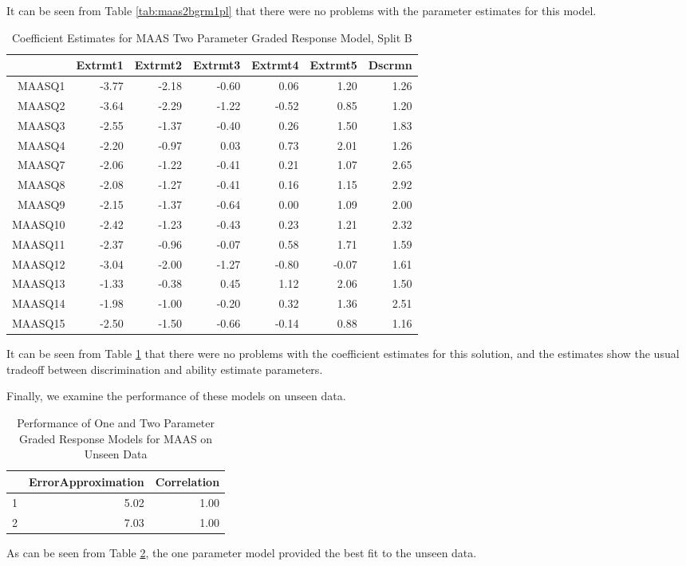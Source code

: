 \documentclass{article}
\begin{document}
It can be seen from Table \ref{tab:maas2bgrm1pl} that there were no problems with the parameter estimates for this model. 

\begin{table}[ht]
\centering
\begin{tabular}{rrrrrrr}
  \hline
 & Extrmt1 & Extrmt2 & Extrmt3 & Extrmt4 & Extrmt5 & Dscrmn \\ 
  \hline
MAASQ1 & -3.77 & -2.18 & -0.60 & 0.06 & 1.20 & 1.26 \\ 
  MAASQ2 & -3.64 & -2.29 & -1.22 & -0.52 & 0.85 & 1.20 \\ 
  MAASQ3 & -2.55 & -1.37 & -0.40 & 0.26 & 1.50 & 1.83 \\ 
  MAASQ4 & -2.20 & -0.97 & 0.03 & 0.73 & 2.01 & 1.26 \\ 
  MAASQ7 & -2.06 & -1.22 & -0.41 & 0.21 & 1.07 & 2.65 \\ 
  MAASQ8 & -2.08 & -1.27 & -0.41 & 0.16 & 1.15 & 2.92 \\ 
  MAASQ9 & -2.15 & -1.37 & -0.64 & 0.00 & 1.09 & 2.00 \\ 
  MAASQ10 & -2.42 & -1.23 & -0.43 & 0.23 & 1.21 & 2.32 \\ 
  MAASQ11 & -2.37 & -0.96 & -0.07 & 0.58 & 1.71 & 1.59 \\ 
  MAASQ12 & -3.04 & -2.00 & -1.27 & -0.80 & -0.07 & 1.61 \\ 
  MAASQ13 & -1.33 & -0.38 & 0.45 & 1.12 & 2.06 & 1.50 \\ 
  MAASQ14 & -1.98 & -1.00 & -0.20 & 0.32 & 1.36 & 2.51 \\ 
  MAASQ15 & -2.50 & -1.50 & -0.66 & -0.14 & 0.88 & 1.16 \\ 
   \hline
\end{tabular}
\caption{Coefficient Estimates for MAAS Two Parameter Graded Response Model, Split B} 
\label{tab:maas2bgrm2pl}
\end{table}
It can be seen from Table \ref{tab:maas2bgrm2pl} that there were no problems with the coefficient estimates for this solution, and the estimates show the usual tradeoff between discrimination and ability estimate parameters. 

Finally, we examine the performance of these models on unseen data.


\begin{table}[ht]
\centering
\begin{tabular}{rrr}
  \hline
 & ErrorApproximation & Correlation \\ 
  \hline
1 & 5.02 & 1.00 \\ 
  2 & 7.03 & 1.00 \\ 
   \hline
\end{tabular}
\caption{Performance of One and Two Parameter Graded Response Models for MAAS on Unseen Data} 
\label{tab:maas2bgrmtest}
\end{table}
As can be seen from Table \ref{tab:maas2bgrmtest}, the one parameter model provided the best fit to the unseen data. 
\end{document}
